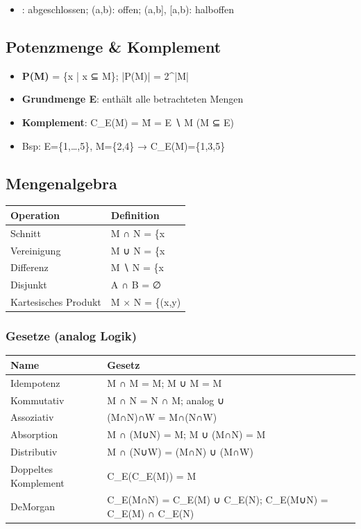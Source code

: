 \documentclass[11pt, a4paper]{article}
\begin{document}
\begin{itemize}
  \item [a,b]: abgeschlossen; (a,b): offen; (a,b], [a,b): halboffen
\end{itemize}


\subsection{Potenzmenge \& Komplement}

\begin{itemize}
  \item \textbf{P(M)} = \{x | x ⊆ M\}; |P(M)| = 2\textasciicircum{}|M|
  \item \textbf{Grundmenge E}: enthält alle betrachteten Mengen
  \item \textbf{Komplement}: C\_E(M) = M̄ = E ∖ M (M ⊆ E)
  \item Bsp: E=\{1,…,5\}, M=\{2,4\} → C\_E(M)=\{1,3,5\}
\end{itemize}


\subsection{Mengenalgebra}


{\small
\begin{tabularx}{\linewidth}{XX}
\hline
\rowcolor{tableheadbg}
{\color{white}\textbf{Operation}} & {\color{white}\textbf{Definition}} \\[2pt]
\hline
\endhead
\hline
\endfoot
Schnitt & M ∩ N = \{x \\
Vereinigung & M ∪ N = \{x \\
Differenz & M ∖ N = \{x \\
Disjunkt & A ∩ B = ∅ \\
Kartesisches Produkt & M × N = \{(x,y) \\
\end{tabularx}
}



\subsubsection{Gesetze (analog Logik)}


{\small
\begin{tabularx}{\linewidth}{XX}
\hline
\rowcolor{tableheadbg}
{\color{white}\textbf{Name}} & {\color{white}\textbf{Gesetz}} \\[2pt]
\hline
\endhead
\hline
\endfoot
Idempotenz & M ∩ M = M; M ∪ M = M \\
Kommutativ & M ∩ N = N ∩ M; analog ∪ \\
Assoziativ & (M∩N)∩W = M∩(N∩W) \\
Absorption & M ∩ (M∪N) = M; M ∪ (M∩N) = M \\
Distributiv & M ∩ (N∪W) = (M∩N) ∪ (M∩W) \\
Doppeltes Komplement & C\_E(C\_E(M)) = M \\
DeMorgan & C\_E(M∩N) = C\_E(M) ∪ C\_E(N); C\_E(M∪N) = C\_E(M) ∩ C\_E(N) \\
\end{tabularx}
}
\end{document}
